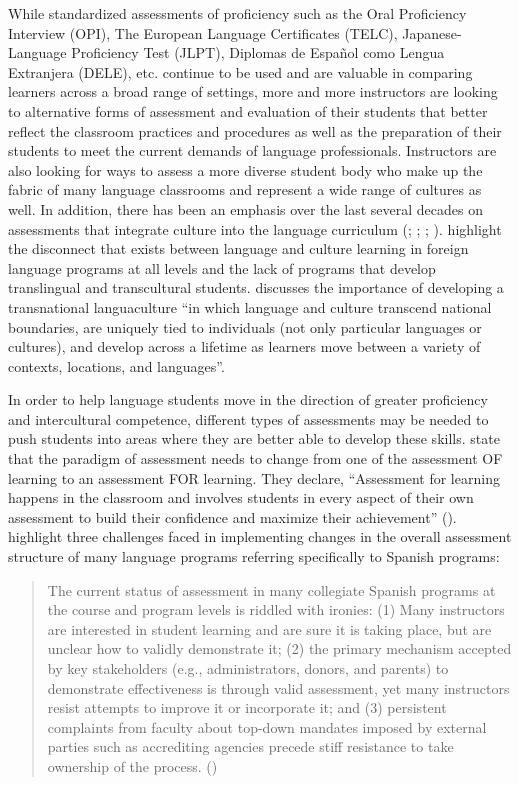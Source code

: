 \documentclass[output=paper]{langscibook}
\begin{document}
While standardized assessments of proficiency such as the Oral Proficiency Interview (OPI), The European Language Certificates (TELC), Japanese-Language Proficiency Test (JLPT), Diplomas de Español como Lengua Extranjera (DELE), etc. continue to be used and are valuable in comparing learners across a broad range of settings, more and more instructors are looking to alternative forms of assessment and evaluation of their students that better reflect the classroom practices and procedures as well as the preparation of their students to meet the current demands of language professionals. Instructors are also looking for ways to assess a more diverse student body who make up the fabric of many language classrooms and represent a wide range of cultures as well. In addition, there has been an emphasis over the last several decades on assessments that integrate culture into the language curriculum (\citealt{Bennett1986}; \citealt{Byram1997}; \citealt{Pedersen2010}; \citealt{Schulz2007}). \citet{ByrnesNorris2010} highlight the disconnect that exists between language and culture learning in foreign language programs at all levels and the lack of programs that develop translingual and transcultural students. \citet[120]{Sykes2017} discusses the importance of developing a transnational languaculture “in which language and culture transcend national boundaries, are uniquely tied to individuals (not only particular languages or cultures), and develop across a lifetime as learners move between a variety of contexts, locations, and languages”.

In order to help language students move in the direction of greater proficiency and intercultural competence, different types of assessments may be needed to push students into areas where they are better able to develop these skills. \citet{StigginsChappuis2006} state that the paradigm of assessment needs to change from one of the assessment OF learning to an assessment FOR learning. They declare, “Assessment for learning happens in the classroom and involves students in every aspect of their own assessment to build their confidence and maximize their achievement” (\citeyear[11]{StigginsChappuis2006}). \citet{BrownThompson2018} highlight three challenges faced in implementing changes in the overall assessment structure of many language programs referring specifically to Spanish programs:

\begin{quote}
The current status of assessment in many collegiate Spanish programs at the course and program levels is riddled with ironies:
(1) Many instructors are interested in student learning and are sure it is taking place, but are unclear how to validly demonstrate it;
(2) the primary mechanism accepted by key stakeholders (e.g., administrators, donors, and parents) to demonstrate effectiveness is through valid assessment, yet many instructors resist attempts to improve it or incorporate it; and
(3) persistent complaints from faculty about top-down mandates imposed by external parties such as accrediting agencies precede stiff resistance to take ownership of the process. (\citeyear[137--138]{BrownThompson2018})
\end{quote}
\end{document}
